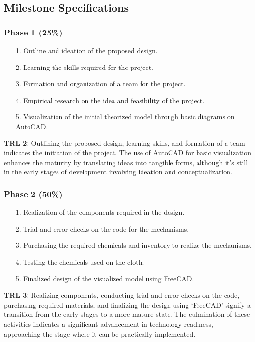 \documentclass[table]{rapportCS}
\begin{document}
\subsection{Milestone Specifications}\label{sec:msspecs}

\subsubsection*{Phase 1 (25\%)}
\begin{enumerate}
    \item[1.] Outline and ideation of the proposed design.
    \item[2.] Learning the skills required for the project.
    \item[3.] Formation and organization of a team for the project.
    \item[4.] Empirical research on the idea and feasibility of the project.
    \item[5.] Visualization of the initial theorized model through basic diagrams on AutoCAD.
\end{enumerate}
\textbf{TRL 2:} Outlining the proposed design, learning skills, and formation of a team indicates the initiation of the project. The use of AutoCAD for basic visualization enhances the maturity by translating ideas into tangible forms, although it's still in the early stages of development involving ideation and conceptualization.

\subsubsection*{Phase 2 (50\%)}
\begin{enumerate}
    \item[1.] Realization of the components required in the design.
    \item[2.] Trial and error checks on the code for the mechanisms.
    \item[3.] Purchasing the required chemicals and inventory to realize the mechanisms.
    \item[4.] Testing the chemicals used on the cloth.
    \item[5.] Finalized design of the visualized model using FreeCAD.
\end{enumerate}
\textbf{TRL 3:} Realizing components, conducting trial and error checks on the code, purchasing required materials, and finalizing the design using ‘FreeCAD’ signify a transition from the early stages to a more mature state. The culmination of these activities indicates a significant advancement in technology readiness, approaching the stage where it can be practically implemented.
\end{document}
